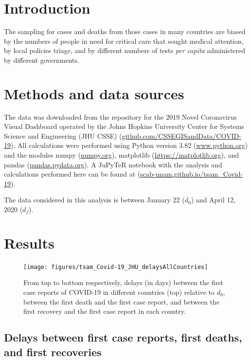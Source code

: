 \documentclass[8pt]{article}
\begin{document}
\section{Introduction}
The sampling for cases and deaths from those cases in many countries are biased by the numbers of people in need for critical care that sought medical attention, by local policies triage, and by different numbers of tests \textit{per capita} administered by different governments. 

\section{Methods and data sources} 

The data was downloaded from the repository for the 2019 Novel Coronavirus Visual Dashboard operated by the Johns Hopkins University Center for Systems Science and Engineering (JHU CSSE)  (\url{github.com/CSSEGISandData/COVID-19}). 
All calculations were performed using Python version 3.82 (\url{www.python.org}) and the modules numpy (\url{numpy.org}), matplotlib (\url{https://matplotlib.org}), and pandas (\url{pandas.pydata.org}). 
A JuPyTeR notebook with the analysis and calculations performed here can be found at (\url{scab-unam.github.io/tsam_Covid-19}).

The data considered in this analysis is between January 22 ($d_0$) and April 12, 2020 ($d_f$).


\section{Results}


\begin{figure}[h]
    \centering
    \texttt{[image: figures/tsam\_Covid-19\_JHU\_delaysAllCountries]}
    \caption{From top to bottom respectively, delays (in days) between the first case reports of COVID-19 in different countries (top) relative to $d_0$, between the first death and the first case report, and  between the first recovery and the first case report 
    in each country.}
    \label{fig:caseDelays}
\end{figure}

\subsection{Delays between first case reports, first deaths, and first recoveries}
\end{document}
